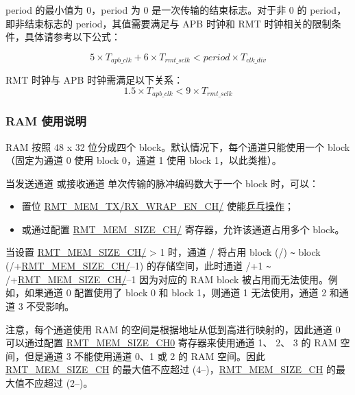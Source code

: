 \documentclass[main\_\_CN.tex]{subfiles}
\begin{document}
period 的最小值为 0，period 为 0 是一次传输的结束标志。对于非 0 的 period，即非结束标志的 period，其值需要满足与 APB 时钟和 RMT 时钟相关的限制条件，具体请参考以下公式：

\begin{equation}\label{eq:rmt-period-value}
5 \times T_{apb\_clk} + 6 \times T_{rmt\_sclk} < period \times T_{clk\_div}
\end{equation}

\begin{tiplisting}
RMT 时钟与 APB 时钟需满足以下关系：
    \begin{equation}
    1.5 \times T_{apb\_clk} < 9 \times T_{rmt\_sclk}
    \end{equation}
\end{tiplisting}

\subsubsection{RAM 使用说明}

RAM 按照 48 x 32 位分成四个 block。默认情况下，每个通道只能使用一个 block（固定为通道 0 使用 block 0，通道 1 使用 block 1，以此类推）。

当发送通道  或接收通道  单次传输的脉冲编码数大于一个 block 时，可以：
\begin{itemize}
    \item 置位 \hyperref[fielddesc:RMTMEMTXWRAPENCHN]{RMT\_MEM\_TX/RX\_WRAP\_EN\_CH/} 使能\hyperref[sec:wrap-tx-mode]{乒乓操作}；
    \item 或通过配置 \hyperref[fielddesc:RMTMEMSIZECHN]{RMT\_MEM\_SIZE\_CH/} 寄存器，允许该通道占用多个 block。
\end{itemize}

当设置 \hyperref[fielddesc:RMTMEMSIZECHN]{RMT\_MEM\_SIZE\_CH/} > 1 时，通道 / 将占用 block (/) \verb+~+ block (/+\hyperref[fielddesc:RMTMEMSIZECHN]{RMT\_MEM\_SIZE\_CH/}$–$1) 的存储空间，此时通道 /+1 \verb+~+ /+\hyperref[fielddesc:RMTMEMSIZECHN]{RMT\_MEM\_SIZE\_CH/}$–$1 因为对应的 RAM block 被占用而无法使用。例如，如果通道 0 配置使用了 block 0 和 block 1，则通道 1 无法使用，通道 2 和通道 3 不受影响。


注意，每个通道使用 RAM 的空间是根据地址从低到高进行映射的，因此通道 0 可以通过配置 \hyperref[fielddesc:RMTMEMSIZECHN]{RMT\_MEM\_SIZE\_CH0} 寄存器来使用通道 1、 2、 3 的 RAM 空间，但是通道 3 不能使用通道 0、1 或 2 的 RAM 空间。因此 \hyperref[fielddesc:RMTMEMSIZECHN]{RMT\_MEM\_SIZE\_CH} 的最大值不应超过 (4$–$)，\hyperref[fielddesc:RMTMEMSIZECHM]{RMT\_MEM\_SIZE\_CH} 的最大值不应超过 (2$–$)。
\end{document}
